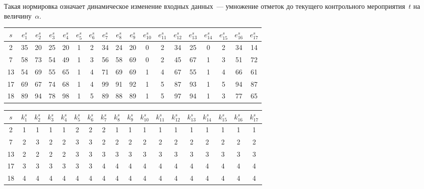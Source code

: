 \begin{multicols}{2}
     Такая нормировка означает динамическое изменение входных 
данных~--- умножение отметок до текущего контрольного мероприятия~$t$ 
на величину~$\alpha$.

\begin{table*}\small %
\begin{center}
\vspace*{2ex}

      \begin{tabular}{|c|c|c|c|c|c|c|c|c|c|c|c|c|c|c|c|c|c|}
      \hline
$s$&$e_1^s$&$e_2^s$&$e_3^s$&$e_4^s$&$e_5^s$&$e_6^s$&$e_7^s$&$e_8^s$&$e_9^s$&$e^s_{1
0}$&$e^s_{11}$&$e^s_{12}$&$e^s_{13}$&$e^s_{14}$&$e^s_{15}$&$e^s_{16}$&$e_{17}^s$\\
\hline
\hphantom{9}2&35&20&25&20&1&2&34&24&20&0&2&34&25&0&2&34&14\\
\hphantom{9}7&58&73&54&49&1&3&56&58&69&0&2&45&67&1&3&51&72\\
13&54&69&55&65&1&4&71&69&69&1&4&67&55&1&4&66&61\\
17&69&67&74&68&1&4&99&91&92&1&5&87&93&1&5&94&87\\
18&89&94&78&98&1&5&89&88&89&1&5&97&94&1&3&77&65\\
\hline
\end{tabular}
\end{center}
\begin{center} 
\vspace*{2ex}

      \begin{tabular}{|c|c|c|c|c|c|c|c|c|c|c|c|c|c|c|c|c|c|}
      \hline
$s$&$k_1^s$&$k_2^s$&$k_3^s$&$k_4^s$&$k_5^s$&$k_6^s$&$k_7^s$&$k_8^s$&$k_9^s$&$k^s_{10}
$&$k^s_{11}$&$k^s_{12}$&$k^s_{13}$&$k^s_{14}$&$k^s_{15}$&$k^s_{16}$&$k_{17}^s$\\
\hline
\hphantom{9}2&1&1&1&1&2&2&2&1&1&1&1&1&1&1&1&1&1\\
\hphantom{9}7&2&3&2&2&3&3&2&2&2&2&2&2&2&2&2&2&2\\
13&2&2&2&2&3&3&3&3&3&3&3&3&3&3&3&3&3\\
17&3&3&3&3&3&3&4&4&4&4&4&4&4&4&4&4&4\\
18&4&4&4&4&4&4&4&4&4&4&4&4&4&4&4&4&4\\
\hline
\end{tabular}
\end{center}
%
\begin{center}
\vspace*{2ex}


\end{center}
\end{table*}
\end{multicols}

